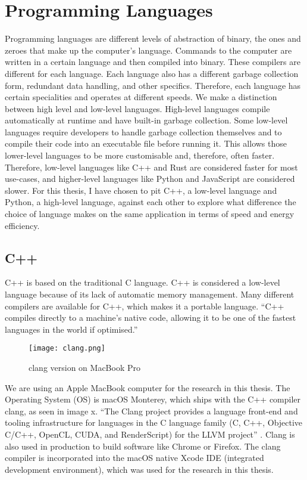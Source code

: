\chapter{Programming Languages}

Programming languages are different levels of abstraction of binary, the ones and zeroes that make up the computer's language. Commands to the computer are written in a certain language and then compiled into binary.
These compilers are different for each language. Each language also has a different garbage collection form, redundant data handling, and other specifics. Therefore, each language has certain specialities and operates at different speeds.
We make a distinction between high level and low-level languages. High-level languages compile automatically at runtime and have built-in garbage collection. Some low-level languages require developers to handle garbage collection themselves and to compile their code into an executable file before running it.
This allows those lower-level languages to be more customisable and, therefore, often faster.
Therefore, low-level languages like C++ and Rust are considered faster for most use-cases, and higher-level languages like Python and JavaScript are considered slower.
For this thesis, I have chosen to pit C++, a low-level language and Python, a high-level language, against each other to explore what difference the choice of language makes on the same application in terms of speed and energy efficiency.

\section{C++}
C++ is based on the traditional C language. C++ is considered a low-level language because of its lack of automatic memory management. Many different compilers are available for C++, which makes it a portable language. “C++ compiles directly to a machine's native code, allowing it to be one of the fastest languages in the world if optimised.”\cite{C++}

\begin{figure}[htbp]
	\centering
	\texttt{[image: clang.png]}
	\caption{clang version on MacBook Pro}
	\label{figure:clang}
\end{figure}

We are using an Apple MacBook computer for the research in this thesis. The Operating System (OS) is macOS Monterey, which ships with the C++ compiler clang, as seen in image x. “The Clang project provides a language front-end and tooling infrastructure for languages in the C language family (C, C++, Objective C/C++, OpenCL, CUDA, and RenderScript) for the LLVM project” \cite{clang}. Clang is also used in production to build software like Chrome or Firefox. The clang compiler is incorporated into the macOS native Xcode IDE (integrated development environment), which was used for the research in this thesis.

